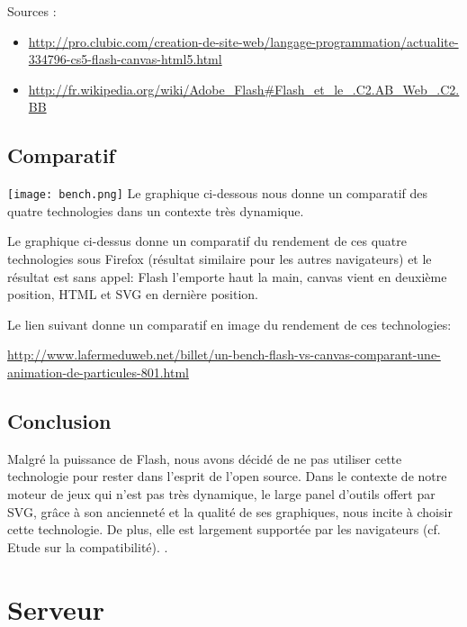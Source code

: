 \documentclass[a4paper,10pt]{report}
\begin{document}
Sources : 
\begin{itemize}
\item  \url{http://pro.clubic.com/creation-de-site-web/langage-programmation/actualite-334796-cs5-flash-canvas-html5.html}
\item \url{http://fr.wikipedia.org/wiki/Adobe_Flash#Flash_et_le_.C2.AB_Web_.C2.BB}
\end{itemize}

\section{Comparatif}
\texttt{[image: bench.png]}
Le graphique ci-dessous nous donne un comparatif des quatre technologies dans 
un contexte très dynamique.
 
Le graphique ci-dessus donne un comparatif du rendement de ces quatre technologies sous 
Firefox (résultat similaire pour les autres navigateurs) et le résultat est sans appel: 
Flash l'emporte haut la main, canvas vient en deuxième position, HTML et SVG en dernière 
position.

  

Le lien suivant donne un comparatif en image du rendement de ces technologies:
 
\url{http://www.lafermeduweb.net/billet/un-bench-flash-vs-canvas-comparant-une-animation-de-particules-801.html}

\section{Conclusion}
Malgré la puissance de Flash, nous avons décidé de ne pas utiliser cette 
technologie pour rester dans l'esprit de l'open source.
Dans le contexte de notre moteur de jeux qui n'est pas très dynamique, le large panel 
d'outils offert par SVG, grâce à son ancienneté et la qualité de ses graphiques,
 nous incite à choisir cette technologie. De plus, elle est largement supportée par les navigateurs
 (cf. Etude sur la compatibilité). .
















\chapter{Serveur}
\end{document}
